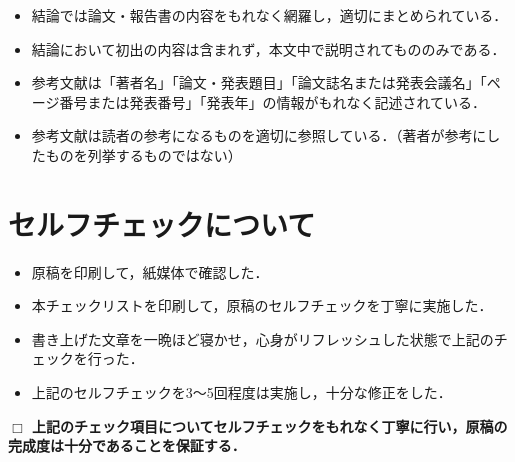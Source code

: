 \documentclass[a4paper,11pt,dvipdfmx]{jlreq}
\begin{document}
\begin{itemize}
 \item 結論では論文・報告書の内容をもれなく網羅し，適切にまとめられている．
 \item 結論において初出の内容は含まれず，本文中で説明されてもののみである．
 \item 参考文献は「著者名」「論文・発表題目」「論文誌名または発表会議名」「ページ番号または発表番号」「発表年」の情報がもれなく記述されている．
 \item 参考文献は読者の参考になるものを適切に参照している．（著者が参考にしたものを列挙するものではない）
\end{itemize}


\section{セルフチェックについて}
\begin{itemize}
 \item 原稿を印刷して，紙媒体で確認した．
 \item 本チェックリストを印刷して，原稿のセルフチェックを丁寧に実施した．
 \item 書き上げた文章を一晩ほど寝かせ，心身がリフレッシュした状態で上記のチェックを行った．
 \item 上記のセルフチェックを3〜5回程度は実施し，十分な修正をした．
\end{itemize}

\underline{\hspace{\columnwidth}}

\textbf{\large
$\Box$ 上記のチェック項目についてセルフチェックをもれなく丁寧に行い，原稿の完成度は十分であることを保証する．
}
\end{document}
